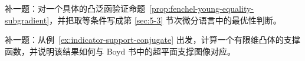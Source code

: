 \begin{exercise}\label{exr:fenchel-young-placeholder}
补一题：对一个具体的凸泛函验证命题~\ref{prop:fenchel-young-equality-subgradient}，并把取等条件写成第 \ref{sec:5-3} 节次微分语言中的最优性判断。
\end{exercise}

\begin{exercise}[支撑函数桥接题占位]\label{exr:support-function-placeholder}
补一题：从例~\ref{ex:indicator-support-conjugate} 出发，计算一个有限维凸体的支撑函数，并说明该结果如何与 Boyd 书中的超平面支撑图像对应。
\end{exercise}

